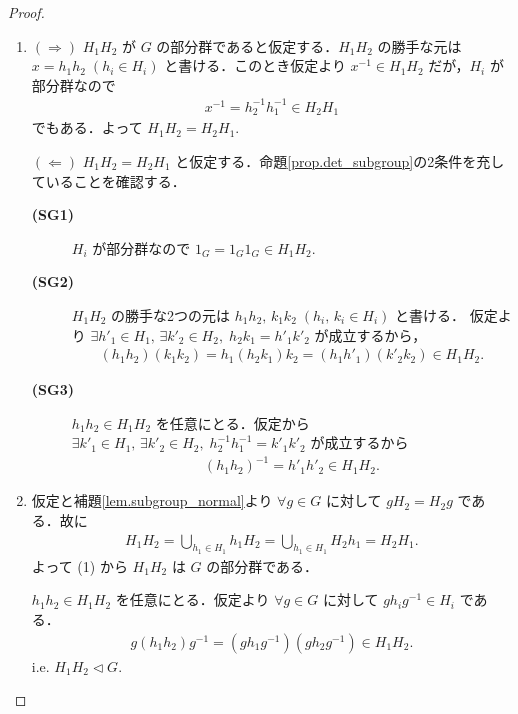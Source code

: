 \documentclass[geometry_main]{subfiles}
\begin{document}
\begin{proof}
	\begin{enumerate}
		\item $(\Longrightarrow)$ $H_1H_2$ が $G$ の部分群であると仮定する．$H_1H_2$ の勝手な元は $x = h_1 h_2\; (h_i \in H_i)$ と書ける．このとき仮定より $x^{-1} \in H_1H_2$ だが，$H_i$ が部分群なので
		\begin{align}
			x^{-1} = h_2^{-1} h_1^{-1} \in H_2H_1
		\end{align}
		でもある．よって $H_1H_2 = H_2H_1.$

		$(\Longleftarrow)$ $H_1H_2 = H_2H_1$ と仮定する．命題\ref{prop.det_subgroup}の2条件を充していることを確認する．
		\begin{description}
			\item[\textbf{(SG1)}] $H_i$ が部分群なので $1_G = 1_G1_G \in H_1H_2.$
			\item[\textbf{(SG2)}] $H_1H_2$ の勝手な2つの元は $h_1 h_2,\, k_1 k_2\; (h_i,\, k_i \in H_i)$ と書ける．
			仮定より $\exists h'_1 \in H_1,\, \exists k'_2 \in H_2,\; h_2k_1 = h'_1 k'_2$ が成立するから，
			\begin{align}
				(h_1h_2)(k_1k_2) = h_1(h_2k_1)k_2 = (h_1h'_1)(k'_2k_2) \in H_1H_2.
			\end{align}
			\item[\textbf{(SG3)}] $h_1h_2 \in H_1H_2$ を任意にとる．仮定から $\exists k'_1 \in H_1,\, \exists k'_2 \in H_2,\; h_2^{-1}h_1^{-1} = k'_1 k'_2$ が成立するから
			\begin{align}
				(h_1h_2)^{-1} = h'_1 h'_2 \in H_1H_2.
			\end{align}
		\end{description}
		\item 仮定と補題\ref{lem.subgroup_normal}より $\forall g \in G$ に対して $gH_2 = H_2g$ である．故に
		\begin{align}
			H_1H_2 = \bigcup_{h_1 \in H_1} h_1H_2 = \bigcup_{h_1 \in H_1} H_2 h_1 = H_2H_1.
		\end{align}
		よって (1) から $H_1H_2$ は $G$ の部分群である．
		
		$h_1h_2 \in H_1H_2$ を任意にとる．仮定より $\forall g \in G$ に対して $gh_ig^{-1} \in H_i$ である．
		\begin{align}
			g(h_1h_2)g^{-1} = (gh_1g^{-1})(gh_2g^{-1}) \in H_1H_2.
		\end{align}
		i.e. $H_1H_2 \vartriangleleft G.$
	\end{enumerate}
\end{proof}
\end{document}
